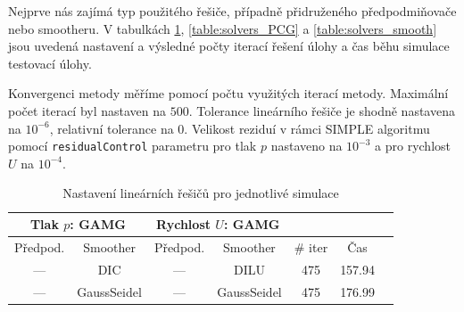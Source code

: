 \documentclass[a4paper,12pt]{report}
\theoremstyle{remark}
\begin{document}
 Nejprve nás zajímá typ použitého řešiče, případně přidruženého předpodmiňovače nebo smootheru. V tabulkách \ref{table:solvers_GAMG}, \ref{table:solvers_PCG} a \ref{table:solvers_smooth} jsou uvedená nastavení a výsledné počty iterací řešení úlohy a čas běhu simulace testovací úlohy.
 
 Konvergenci metody měříme pomocí počtu využitých iterací metody. Maximální počet iterací byl nastaven na $500$. Tolerance lineárního řešiče je shodně nastavena na $10^{-6}$, relativní tolerance na $0$. Velikost reziduí v rámci SIMPLE algoritmu pomocí \texttt{residualControl} parametru pro tlak $p$ nastaveno na $10^{-3}$ a pro rychlost $U$ na $10^{-4}$.

 \begin{table}[H]
	\centering
	\caption{Nastavení lineárních řešičů pro jednotlivé simulace}
	\renewcommand{\arraystretch}{1.9}
	\begin{tabular}{*7c}
		\toprule
		\multicolumn{2}{c}{Tlak $p$: \textbf{GAMG}} & \multicolumn{2}{c}{Rychlost $U$: \textbf{GAMG}}\\		
		\midrule
		Předpod.&Smoother&Předpod.&Smoother&\# iter&Čas\\
		\midrule
 --- & DIC & --- &  DILU & 475 &157.94\\		
 --- & GaussSeidel &  --- & GaussSeidel & 475&176.99\\
		
			\bottomrule
\end{tabular}

\label{table:solvers_GAMG}

\end{table}
\end{document}
